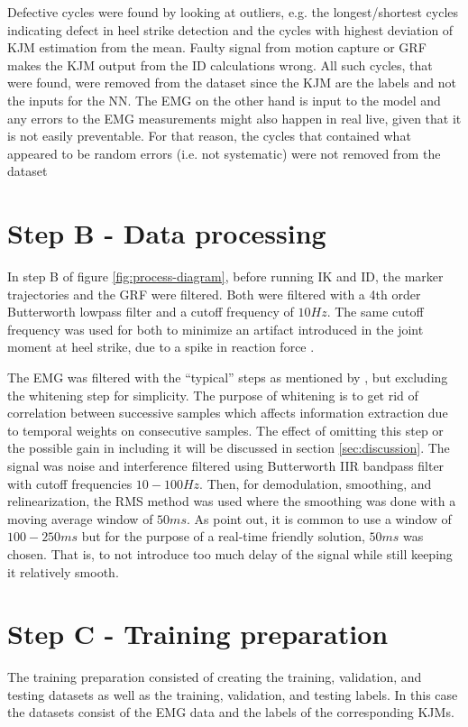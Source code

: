 \documentclass[../main.tex]{subfiles}
\begin{document}
Defective cycles were found by looking at outliers, e.g. the longest/shortest cycles indicating defect in heel strike detection and the cycles with highest deviation of \ac{KJM} estimation from the mean.
Faulty signal from motion capture or \ac{GRF} makes the \ac{KJM} output from the \ac{ID} calculations wrong.
All such cycles, that were found, were removed from the dataset since the \ac{KJM} are the labels and not the inputs for the \ac{NN}.
The \ac{EMG} on the other hand is input to the model and any errors to the \ac{EMG} measurements might also happen in real live, given that it is not easily preventable.
For that reason, the cycles that contained what appeared to be random errors (i.e. not systematic) were not removed from the dataset

\section{Step B - Data processing}
\label{sec:data-processing}
In step B of figure \ref{fig:process-diagram}, before running \ac{IK} and \ac{ID}, the marker trajectories and the \ac{GRF} were filtered.
Both were filtered with a 4th order Butterworth lowpass filter and a cutoff frequency of $10Hz$. 
The same cutoff frequency was used for both to minimize an artifact introduced in the joint moment at heel strike, due to a spike in reaction force \cite{Kristianslund2012}.

The \ac{EMG} was filtered with the ``typical'' steps as mentioned by \textcite[99]{Clancy2016}, but excluding the whitening step for simplicity.
The purpose of whitening is to get rid of correlation between successive samples which affects information extraction due to temporal weights on consecutive samples.
The effect of omitting this step or the possible gain in including it will be discussed in section \ref{sec:discussion}.
The signal was noise and interference filtered using Butterworth IIR bandpass filter with cutoff frequencies $10-100Hz$. 
Then, for demodulation, smoothing, and relinearization, the RMS method was used where the smoothing was done with a moving average window of $50ms$. 
As \textcite{Clancy2016} point out, it is common to use a window of $100-250 ms$ but for the purpose of a real-time friendly solution, $50ms$ was chosen.
That is, to not introduce too much delay of the signal while still keeping it relatively smooth.

\section{Step C - Training preparation}
The training preparation consisted of creating the training, validation, and testing datasets as well as the training, validation, and testing labels.
In this case the datasets consist of the \ac{EMG} data and the labels of the corresponding \acp{KJM}.
\end{document}

